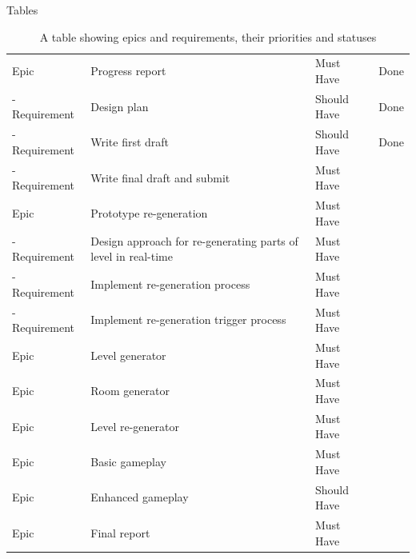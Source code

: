 \documentclass[final]{cmpreport}
\begin{document}
\begin{section}{Tables}
\begin{table}[H]
{\begin{tabular}{llll}
    Epic & Progress report & Must Have & Done \\
    - Requirement & Design plan & Should Have & Done \\
    - Requirement & Write first draft & Should Have & Done \\
    - Requirement & Write final draft and submit & Must Have &  \\ \hline
    Epic & Prototype re-generation & Must Have &  \\
    - Requirement & Design approach for re-generating parts of level in real-time & Must Have &  \\
    - Requirement & Implement re-generation process & Must Have &  \\
    - Requirement & Implement re-generation trigger process & Must Have &  \\ \hline
    Epic & Level generator & Must Have &  \\ \hline
    Epic & Room generator & Must Have &  \\ \hline
    Epic & Level re-generator & Must Have &  \\ \hline
    Epic & Basic gameplay & Must Have &  \\ \hline
    Epic & Enhanced gameplay & Should Have &  \\ \hline
    Epic & Final report & Must Have &  \\ \hline
    \end{tabular}%
    }
    \caption{A table showing epics and requirements, their priorities and statuses}
    \label{tab:epicreqs}
\end{table}


\end{section}
\end{document}
